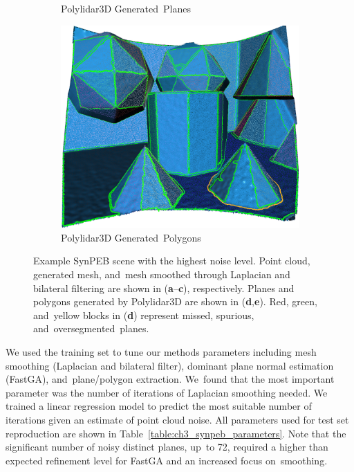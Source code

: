 \begin{figure}[ht]
\begin{subfigure}[t]{.45\linewidth}
    \caption{\label{fig:ch3_synpeb_d}Polylidar3D Generated~Planes}
  \end{subfigure}
  \hspace{1cm}
  \begin{subfigure}[t]{.45\linewidth}
    \centering\includegraphics[width=.75\linewidth]{chapter_3_polylidar3d/imgs/synpeb_var4_polygons_raw.png}
    \caption{\label{fig:ch3_synpeb_e}Polylidar3D Generated~Polygons}
  \end{subfigure}
  \caption[Example of Polylidar3D used with organized point clouds]{Example SynPEB scene with the highest noise level. Point cloud, generated mesh, and~mesh  smoothed through Laplacian and bilateral filtering are shown in (\textbf{a}--\textbf{c}), respectively.  Planes and polygons generated by Polylidar3D are shown in (\textbf{d},\textbf{e}). Red, green, and~yellow blocks in (\textbf{d}) represent missed, spurious, and~oversegmented~planes.}\label{fig:ch3_synpeb_pics}
\end{figure}

We used the training set to tune our methods parameters including mesh smoothing (Laplacian and bilateral filter), dominant plane normal estimation (FastGA), and~plane/polygon extraction. We~found that the most important parameter was the number of iterations of Laplacian smoothing needed. We trained a linear regression model to predict the most suitable number of iterations given an estimate of point cloud noise. All parameters used for test set reproduction are shown in Table~\ref{table:ch3_synpeb_parameters}. Note that the significant number of noisy distinct planes, up~to 72, required a higher than expected refinement level for FastGA and an increased focus on~smoothing.


